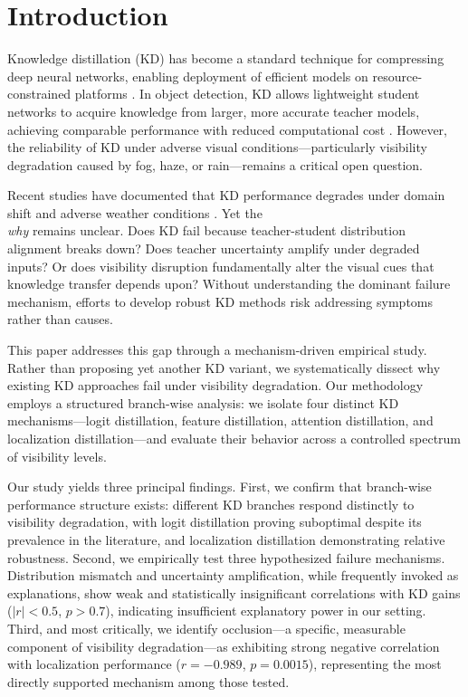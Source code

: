 \section{Introduction}
\label{sec:intro}

Knowledge distillation (KD) has become a standard technique for compressing deep neural networks, enabling deployment of efficient models on resource-constrained platforms \cite{hinton2015distilling}. In object detection, KD allows lightweight student networks to acquire knowledge from larger, more accurate teacher models, achieving comparable performance with reduced computational cost \cite{chen2017learning, dai2021general}. However, the reliability of KD under adverse visual conditions---particularly visibility degradation caused by fog, haze, or rain---remains a critical open question.

Recent studies have documented that KD performance degrades under domain shift and adverse weather conditions \cite{guo2021meets, du2022learning}. Yet the \\\emph{why} remains unclear. Does KD fail because teacher-student distribution alignment breaks down? Does teacher uncertainty amplify under degraded inputs? Or does visibility disruption fundamentally alter the visual cues that knowledge transfer depends upon? Without understanding the dominant failure mechanism, efforts to develop robust KD methods risk addressing symptoms rather than causes.

This paper addresses this gap through a mechanism-driven empirical study. Rather than proposing yet another KD variant, we systematically dissect why existing KD approaches fail under visibility degradation. Our methodology employs a structured branch-wise analysis: we isolate four distinct KD mechanisms---logit distillation, feature distillation, attention distillation, and localization distillation---and evaluate their behavior across a controlled spectrum of visibility levels.

Our study yields three principal findings. First, we confirm that branch-wise performance structure exists: different KD branches respond distinctly to visibility degradation, with logit distillation proving suboptimal despite its prevalence in the literature, and localization distillation demonstrating relative robustness. Second, we empirically test three hypothesized failure mechanisms. Distribution mismatch and uncertainty amplification, while frequently invoked as explanations, show weak and statistically insignificant correlations with KD gains ($|r| < 0.5$, $p > 0.7$), indicating insufficient explanatory power in our setting. Third, and most critically, we identify occlusion---a specific, measurable component of visibility degradation---as exhibiting strong negative correlation with localization performance ($r=-0.989$, $p=0.0015$), representing the most directly supported mechanism among those tested.

